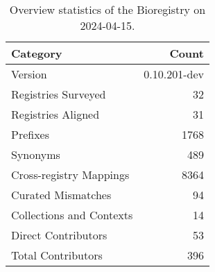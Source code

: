 \begin{table}
\caption{Overview statistics of the Bioregistry on 2024-04-15.}
\label{tab:bioregistry-summary}
\begin{tabular}{lr}
\toprule
Category & Count \\
\midrule
Version & 0.10.201-dev \\
Registries Surveyed & 32 \\
Registries Aligned & 31 \\
Prefixes & 1768 \\
Synonyms & 489 \\
Cross-registry Mappings & 8364 \\
Curated Mismatches & 94 \\
Collections and Contexts & 14 \\
Direct Contributors & 53 \\
Total Contributors & 396 \\
\bottomrule
\end{tabular}
\end{table}
